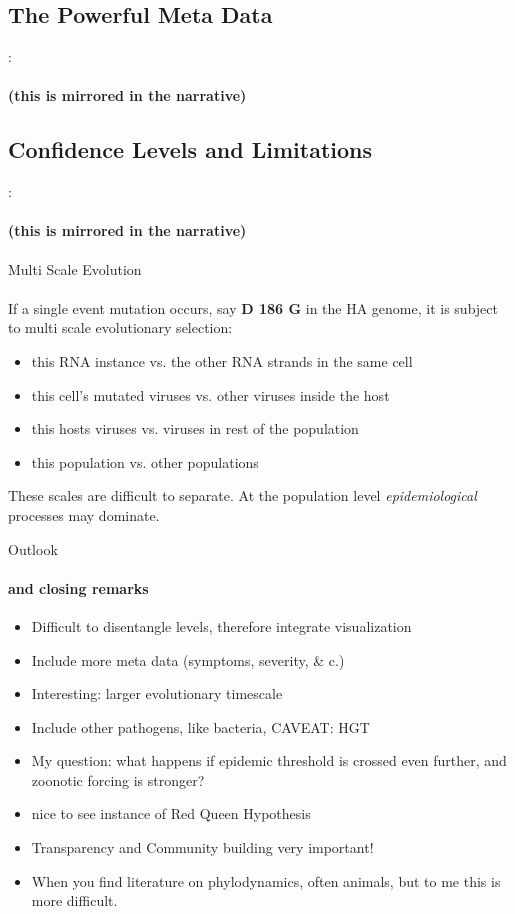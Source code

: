 \documentclass{beamer}
\begin{document}
\begin{darkframes}
    \subsection{The Powerful Meta Data}
    \begin{frame}{\secname : \subsecname}
      \framesubtitle{(this is mirrored in the narrative)}
    \end{frame}

    \subsection{Confidence Levels and Limitations}
    \begin{frame}{\secname : \subsecname}
      \framesubtitle{(this is mirrored in the narrative)}
    \end{frame}

    \begin{frame}{Multi Scale Evolution}
      \framesubtitle{}
      If a single event mutation occurs, say \textbf{D 186 G} in the HA genome, it is subject to multi scale evolutionary selection:
      \begin{itemize}
        \item this RNA instance vs. the other RNA strands in the same cell
        \item this cell's mutated viruses vs. other viruses inside the host
        \item this hosts viruses vs. viruses in rest of the population
        \item this population vs. other populations
      \end{itemize}
      These scales are difficult to separate. At the population level \textit{epidemiological} processes may dominate.
    \end{frame}

    \begin{frame}{Outlook}
      \framesubtitle{and closing remarks}
      \begin{itemize}
        \item Difficult to disentangle levels, therefore integrate visualization
        \item Include more meta data (symptoms, severity, \& c.)
        \item Interesting: larger evolutionary timescale
        \item Include other pathogens, like bacteria, CAVEAT: HGT
        \item My question: what happens if epidemic threshold is crossed even further, and zoonotic forcing is stronger?
        \item nice to see instance of Red Queen Hypothesis
        \item Transparency and Community building very important!
        \item When you find literature on phylodynamics, often animals, but to me this is more difficult.
      \end{itemize}
    \end{frame}


\end{darkframes}
\end{document}
